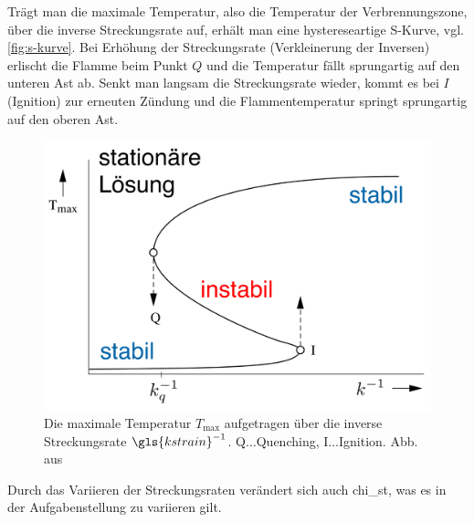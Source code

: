 Trägt man die maximale Temperatur, also die Temperatur der Verbrennungszone, über die inverse Streckungsrate auf, erhält man eine hystereseartige S-Kurve, vgl. \autoref{fig:s-kurve}. Bei Erhöhung der Streckungsrate (Verkleinerung der Inversen) erlischt die Flamme beim Punkt $Q$ und die Temperatur fällt sprungartig auf den unteren Ast ab. Senkt man langsam die Streckungsrate wieder, kommt es bei $I$ (Ignition) zur erneuten Zündung und die Flammentemperatur springt sprungartig auf den oberen Ast.
\begin{figure}[h]
    \begin{center}\begin{minipage}{0.5\linewidth}
        \includegraphics[width=\linewidth]{S-Kurve}
    \end{minipage}\end{center}
    \caption{Die maximale Temperatur $T_\mathrm{max}$ aufgetragen über die inverse Streckungsrate $\gls{kstrain}^{-1}$. Q$\ldots$Quenching, I$\ldots$Ignition. Abb. aus \cite{hasse-pdf05} }
    \label{fig:s-kurve}
\end{figure}
Durch das Variieren der Streckungsraten verändert sich auch \gls{chi_st}, was es in der Aufgabenstellung zu variieren gilt.
